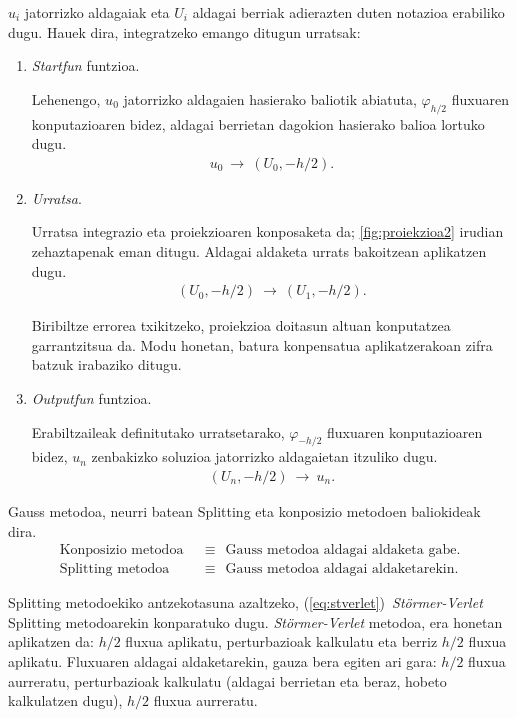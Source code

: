 $u_i$ jatorrizko aldagaiak eta $U_i$ aldagai berriak adierazten duten notazioa erabiliko dugu. Hauek dira, integratzeko emango ditugun urratsak:
\begin{enumerate}
\item \emph{Startfun} funtzioa.

Lehenengo, $u_0$ jatorrizko aldagaien hasierako baliotik abiatuta, $\varphi_{h/2}$ fluxuaren konputazioaren bidez, aldagai berrietan dagokion hasierako balioa lortuko dugu.
\begin{align*}
u_0 \ \rightarrow \ (U_0,-h/2).
\end{align*}

\item \emph{Urratsa}.

Urratsa integrazio eta proiekzioaren konposaketa da; \ref{fig:proiekzioa2} irudian zehaztapenak eman ditugu. Aldagai aldaketa urrats bakoitzean aplikatzen dugu.  
\begin{align*}
(U_0,-h/2) \ \rightarrow \ (U_1,-h/2).
\end{align*}

Biribiltze errorea txikitzeko, proiekzioa doitasun altuan konputatzea garrantzitsua da. Modu honetan, batura konpensatua aplikatzerakoan zifra batzuk irabaziko ditugu. 

\item \emph{Outputfun} funtzioa.

Erabiltzaileak definitutako urratsetarako, $\varphi_{-h/2}$ fluxuaren konputazioaren bidez, $u_n$ zenbakizko soluzioa jatorrizko aldagaietan  itzuliko dugu.
\begin{align*}
(U_n,-h/2) \ \rightarrow \ u_n.
\end{align*}


\end{enumerate}


Gauss metodoa, neurri batean  Splitting eta konposizio metodoen baliokideak dira. 
\begin{align*}
\text{Konposizio metodoa} \ \ &\equiv \ \ \text{Gauss metodoa aldagai aldaketa gabe}.\\
\text{Splitting metodoa}  \ \ &\equiv \ \  \text{Gauss metodoa aldagai aldaketarekin}.
\end{align*}

Splitting metodoekiko antzekotasuna azaltzeko, (\ref{eq:stverlet})~\emph{Störmer-Verlet} Splitting metodoarekin konparatuko dugu. \emph{Störmer-Verlet} metodoa, era honetan aplikatzen da: $h/2$ fluxua aplikatu, perturbazioak kalkulatu eta berriz  $h/2$ fluxua aplikatu. Fluxuaren aldagai aldaketarekin, gauza bera egiten ari gara: $h/2$ fluxua aurreratu, perturbazioak kalkulatu (aldagai berrietan eta beraz, hobeto kalkulatzen dugu), $h/2$ fluxua aurreratu. 

